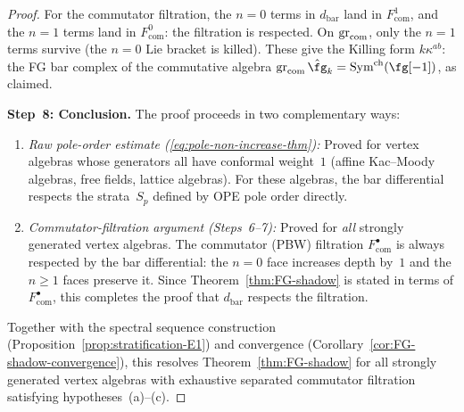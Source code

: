 \begin{proof}
For the commutator filtration, the $n=0$ terms in $d_{\mathrm{bar}}$ land in
$F^1_{\mathrm{com}}$, and the $n=1$ terms land in $F^0_{\mathrm{com}}$: the
filtration is respected. On $\operatorname{gr}_{\mathrm{com}}$, only the $n=1$ terms
survive (the $n=0$ Lie bracket is killed). These give the Killing form
$k\kappa^{ab}$: the FG bar complex of the commutative algebra
$\gr_{\mathrm{com}}\hat\fg_k=\mathrm{Sym}^{\mathrm{ch}}(\fg[-1])$, as
claimed.

\smallskip
\textbf{Step~8: Conclusion.}
The proof proceeds in two complementary ways:
\begin{enumerate}[label=(\alph*)]
\item \emph{Raw pole-order estimate
\textup{(}\eqref{eq:pole-non-increase-thm}\textup{)}:}
Proved for vertex algebras whose generators all have conformal weight~$1$
(affine Kac--Moody algebras, free fields, lattice algebras). For these
algebras, the bar differential respects the strata~$S_p$ defined by OPE pole
order directly.

\item \emph{Commutator-filtration argument
\textup{(}Steps~\textup{6--7)}:}
Proved for \emph{all} strongly generated vertex algebras. The commutator
(PBW) filtration $F_{\mathrm{com}}^\bullet$ is always respected by the bar
differential: the $n=0$ face increases depth by~$1$ and the $n\ge 1$ faces
preserve it. Since Theorem~\ref{thm:FG-shadow} is stated in terms of
$F_{\mathrm{com}}^\bullet$, this completes the proof that
$d_{\mathrm{bar}}$ respects the filtration.
\end{enumerate}

Together with the spectral sequence construction
(Proposition~\ref{prop:stratification-E1}) and convergence
(Corollary~\ref{cor:FG-shadow-convergence}), this resolves
Theorem~\ref{thm:FG-shadow} for all strongly generated vertex algebras
with exhaustive separated commutator filtration satisfying
hypotheses~(a)--(c).
\end{proof}


